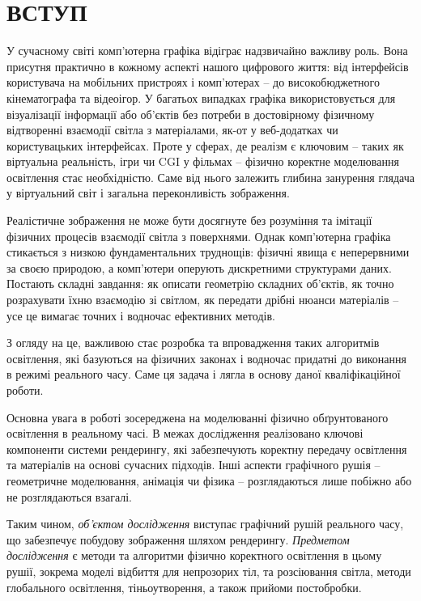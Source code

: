 \normalsize
\chapter*{ВСТУП}

У сучасному світі комп’ютерна графіка відіграє надзвичайно важливу роль. Вона присутня практично в кожному аспекті нашого цифрового життя: від інтерфейсів користувача на мобільних пристроях і комп’ютерах -- до ви\-со\-ко\-бюджет\-но\-го кінематографа та відеоігор. У багатьох випадках графіка використовується для візуалізації інформації або об'єктів без потреби в достовірному фізичному відтворенні взаємодії світла з матеріалами, як-от у веб-додатках чи користувацьких інтерфейсах.
Проте у сферах, де реалізм є ключовим -- таких як віртуальна реальність, ігри чи CGI у фільмах -- фізично коректне мо\-де\-лю\-ван\-ня освітлення стає необхідністю. Саме від нього залежить глибина за\-ну\-рен\-ня глядача у віртуальний світ і загальна переконливість зображення.

\par Реалістичне зображення не може бути досягнуте без розуміння та імітації фізичних процесів взаємодії світла з поверхнями. Однак комп’ютерна графіка стикається з низкою фундаментальних труднощів: фізичні явища є неперервними за своєю природою, а комп’ютери оперують дискретними структурами даних. Постають складні завдання: як описати геометрію складних об'єктів, як точно розрахувати їхню взаємодію зі світлом, як передати дрібні нюанси матеріалів -- усе це вимагає точних і водночас ефективних методів.

\par З огляду на це, важливою стає розробка та впровадження таких алгорит\-мів освітлення, які базуються на фізичних законах і водночас придатні до виконання в режимі реального часу. Саме ця задача і лягла в основу даної кваліфікаційної роботи.

\par Основна увага в роботі зосереджена на моделюванні фізично обґрунтованого освітлення в реальному часі. В межах дослідження реалізовано ключові компоненти системи рендерингу, які забезпечують коректну передачу ос\-віт\-лен\-ня та матеріалів на основі сучасних підходів. Інші аспекти графічного ру\-шія -- геометричне моделювання, анімація чи фізика -- розглядаються лише по\-біж\-но або не розглядаються взагалі.

\par Таким чином, \textit{об’єктом дослідження} виступає графічний рушій реального часу, що забезпечує побудову зоб\-ра\-жен\-ня шляхом рендерингу.
\textit{Предметом дослідження} є методи та алгоритми фізично коректного освітлен\-ня в цьому рушії, зокрема моделі відбиття для непрозорих тіл, та розсіювання світла, методи глобального освітлення, тіньоутворення, а також прийоми постобробки.

